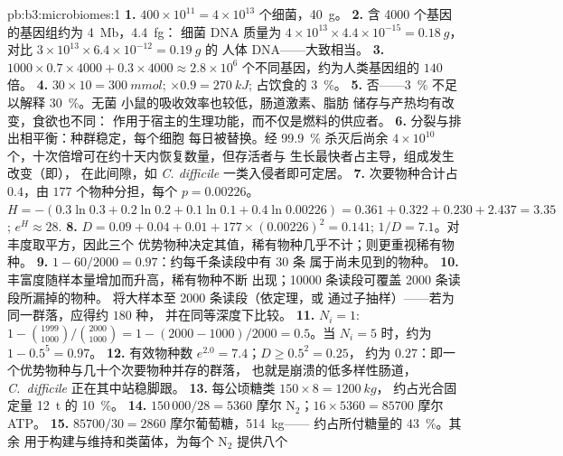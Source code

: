 \begin{solution}{pb:b3:microbiomes:1}
\textbf{1.} $400\times 10^{11} = 4\times 10^{13}$ 个细菌，\qty{40}{g}。
\textbf{2.} 含 \num{4000} 个基因的基因组约为 \qty{4}{Mb}，\qty{4.4}{fg}：
细菌 DNA 质量为 $4\times 10^{13}\times 4.4\times 10^{-15} = \qty{0.18}{g}$，
对比 $3\times 10^{13}\times 6.4\times 10^{-12} = \qty{0.19}{g}$ 的
人体 DNA——大致相当。
\textbf{3.} $1000\times 0.7\times 4000 + 0.3\times 4000 \approx 2.8\times
10^{6}$ 个不同基因，约为人类基因组的 $140$ 倍。
\textbf{4.} $30\times 10 = \qty{300}{mmol}$; $\times 0.9 = \qty{270}{kJ}$;
占饮食的 \qty{3}{\%}。
\textbf{5.} 否——\qty{3}{\%} 不足以解释 \qty{30}{\%}。无菌
小鼠的吸收效率也较低，肠道激素、脂肪
储存与产热均有改变，食欲也不同：
作用于宿主的生理功能，而不仅是燃料的供应者。
\textbf{6.} 分裂与排出相平衡：种群稳定，每个细胞
每日被替换。经 \qty{99.9}{\%} 杀灭后尚余
$4\times 10^{10}$ 个，十次倍增可在约十天内恢复数量，但存活者与
生长最快者占主导，组成发生改变（即），
在此间隙，如 \emph{C.
difficile} 一类入侵者即可定居。
\textbf{7.} 次要物种合计占 $0.4$，由 $177$ 个物种分担，每个 $p = 0.00226$。$H
= -(0.3\ln 0.3 + 0.2\ln 0.2 + 0.1\ln 0.1 + 0.4\ln 0.00226) = 0.361 +
0.322 + 0.230 + 2.437 = 3.35$; $e^{H} \approx 28$.
\textbf{8.} $D = 0.09 + 0.04 + 0.01 + 177\times (0.00226)^{2} = 0.141$;
$1/D = 7.1$。对丰度取平方，因此三个
优势物种决定其值，稀有物种几乎不计；则更重视稀有物种。
\textbf{9.} $1 - 60/2000 = 0.97$：约每千条读段中有 $30$ 条
属于尚未见到的物种。
\textbf{10.} 丰富度随样本量增加而升高，稀有物种不断
出现；\num{10000} 条读段可覆盖 \num{2000} 条读段所漏掉的物种。
将大样本至 \num{2000} 条读段（依定理，或
通过子抽样）——若为同一群落，应得约 $180$ 种，
并在同等深度下比较。
\textbf{11.} $N_{i} = 1$: $1 - \binom{1999}{1000}/\binom{2000}{1000} =
1 - (2000 - 1000)/2000 = 0.5$。当 $N_{i} = 5$ 时，约为 $1 - 0.5^{5} = 0.97$。
\textbf{12.} 有效物种数 $e^{2.0} = 7.4$；$D \ge 0.5^{2} = 0.25$，
约为 $0.27$：即一个优势物种与几十个次要物种并存的群落，
也就是崩溃的低多样性肠道，
\emph{C.~difficile} 正在其中站稳脚跟。
\textbf{13.} 每公顷糖类 $150\times 8 = \qty{1200}{kg}$，
约占光合固定量 \qty{12}{t} 的 \qty{10}{\%}。
\textbf{14.} $150\,000/28 = 5360$ 摩尔 N$_{2}$；$16\times 5360 =
\num{85700}$ 摩尔 ATP。
\textbf{15.} $\num{85700}/30 = 2860$ 摩尔葡萄糖，\qty{514}{kg}——
约占所付糖量的 \qty{43}{\%}。其余
用于构建与维持和类菌体，为每个 N$_{2}$ 提供八个

\end{solution}
